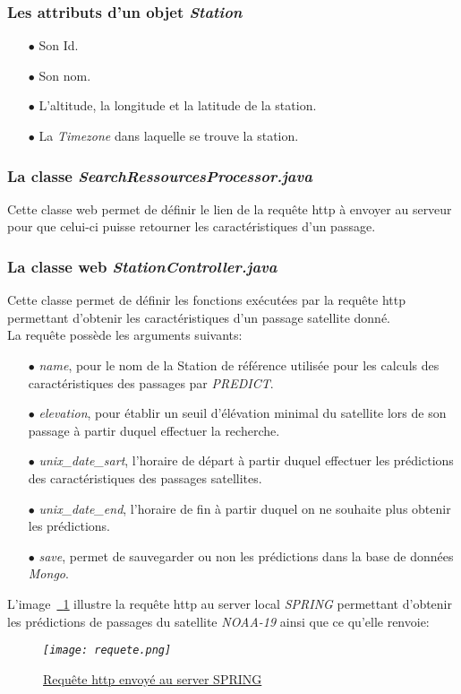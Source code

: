 \documentclass[12pt,fleqn]{book} %
\begin{document}
\subsubsection{Les attributs d'un objet \emph{Station}}
\begin{itemize}
 \item[$\bullet$] Son Id.
 \item[$\bullet$] Son nom.
 \item[$\bullet$] L'altitude, la longitude et la latitude de la station.
 \item[$\bullet$] La \emph{Timezone} dans laquelle se trouve la station.
\end{itemize}
\subsubsection{La classe \emph{SearchRessourcesProcessor.java}}
\noindent Cette classe web permet de définir le lien de la requête http à envoyer au serveur pour que celui-ci puisse retourner les caractéristiques d'un passage.
\subsubsection{La classe web \emph{StationController.java}}
\noindent Cette classe permet de définir les fonctions exécutées par la requête http permettant d'obtenir les caractéristiques d'un passage satellite donné.
~\\La requête possède les arguments suivants:
\begin{itemize}
 \item[$\bullet$] \emph{name}, pour le nom de la Station de référence utilisée pour les calculs des caractéristiques des passages par \emph{PREDICT}.
 \item[$\bullet$] \emph{elevation}, pour établir un seuil d'élévation minimal du satellite lors de son passage à partir duquel effectuer la recherche.
 \item[$\bullet$] \emph{unix\_date\_sart}, l'horaire de départ à partir duquel effectuer les prédictions des caractéristiques des passages satellites.
 \item[$\bullet$] \emph{unix\_date\_end}, l'horaire de fin à partir duquel on ne souhaite plus obtenir les prédictions.
 \item[$\bullet$] \emph{save}, permet de sauvegarder ou non les prédictions dans la base de données \emph{Mongo}.
\end{itemize}
L'image~\underline{\color{blue}~\ref{requete}} illustre la requête http au server local \emph{SPRING} permettant d'obtenir les prédictions de passages du satellite \emph{NOAA-19} ainsi que ce qu'elle renvoie:
\begin{figure}[H]
	\centering
	\itshape
	\texttt{[image: requete.png]}
	\caption{\label{requete} \underline{Requête http envoyé au server SPRING}}
\end{figure}
\end{document}
